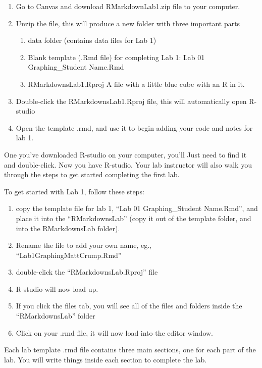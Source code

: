 \documentclass[
]{book}
\providecommand{\tightlist}{%
  \setlength{\itemsep}{0pt}\setlength{\parskip}{0pt}}
\begin{document}
\begin{enumerate}
\def\labelenumi{\arabic{enumi}.}
\item
  Go to Canvas and download RMarkdownLab1.zip file to your computer.
\item
  Unzip the file, this will produce a new folder with three important parts

  \begin{enumerate}
  \def\labelenumii{\alph{enumii}.}
  \tightlist
  \item
    data folder (contains data files for Lab 1)
  \item
    Blank template (.Rmd file) for completing Lab 1: Lab 01 Graphing\_Student Name.Rmd
  \item
    RMarkdownsLab1.Rproj A file with a little blue cube with an R in it.
  \end{enumerate}
\item
  Double-click the RMarkdownsLab1.Rproj file, this will automatically open R-studio
\item
  Open the template .rmd, and use it to begin adding your code and notes for lab 1.
\end{enumerate}

One you've downloaded R-studio on your computer, you'll Just need to find it and double-click. Now you have R-studio. Your lab instructor will also walk you through the steps to get started completing the first lab.

To get started with Lab 1, follow these steps:

\begin{enumerate}
\def\labelenumi{\arabic{enumi}.}
\tightlist
\item
  copy the template file for lab 1, ``Lab 01 Graphing\_Student Name.Rmd'', and place it into the ``RMarkdownsLab'' (copy it out of the template folder, and into the RMarkdownsLab folder).
\item
  Rename the file to add your own name, eg., ``Lab1GraphingMattCrump.Rmd''
\item
  double-click the ``RMarkdownsLab.Rproj'' file
\item
  R-studio will now load up.
\item
  If you click the files tab, you will see all of the files and folders inside the ``RMarkdownsLab'' folder
\item
  Click on your .rmd file, it will now load into the editor window.
\end{enumerate}

Each lab template .rmd file contains three main sections, one for each part of the lab. You will write things inside each section to complete the lab.
\end{document}
